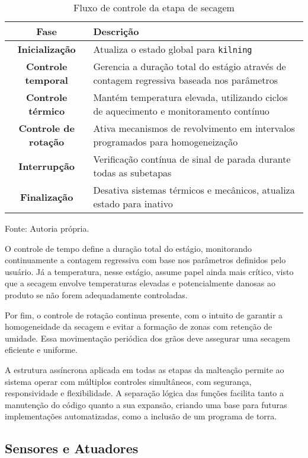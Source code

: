 \begin{table}[H]
    \caption{Fluxo de controle da etapa de secagem}
    \label{tab:secagem_fluxo}
    \centering
    \begin{tabular}{>{\bfseries}c p{10cm}}
        \hline
        Fase & Descrição \\
        \hline
        Inicialização & Atualiza o estado global para \texttt{kilning} \\
        Controle temporal & Gerencia a duração total do estágio através de contagem regressiva baseada nos parâmetros \\
        Controle térmico & Mantém temperatura elevada, utilizando ciclos de aquecimento e monitoramento contínuo \\
        Controle de rotação & Ativa mecanismos de revolvimento em intervalos programados para homogeneização \\
        Interrupção & Verificação contínua de sinal de parada durante todas as subetapas \\
        Finalização & Desativa sistemas térmicos e mecânicos, atualiza estado para inativo \\
        \hline
    \end{tabular}

    {\centering\footnotesize Fonte: Autoria própria.\par}
\end{table}

O controle de tempo define a duração total do estágio, monitorando continuamente a contagem regressiva com base nos parâmetros definidos pelo usuário. Já a temperatura, nesse estágio, assume papel ainda mais crítico, visto que a secagem envolve temperaturas elevadas e potencialmente danosas ao produto se não forem adequadamente controladas.

Por fim, o controle de rotação continua presente, com o intuito de garantir a homogeneidade da secagem e evitar a formação de zonas com retenção de umidade. Essa movimentação periódica dos grãos deve assegurar uma secagem eficiente e uniforme.

A estrutura assíncrona aplicada em todas as etapas da malteação permite ao sistema operar com múltiplos controles simultâneos, com segurança, responsividade e flexibilidade. A separação lógica das funções facilita tanto a manutenção do código quanto a sua expansão, criando uma base para futuras implementações automatizadas, como a inclusão de um programa de torra.
 
\subsection{Sensores e Atuadores}

